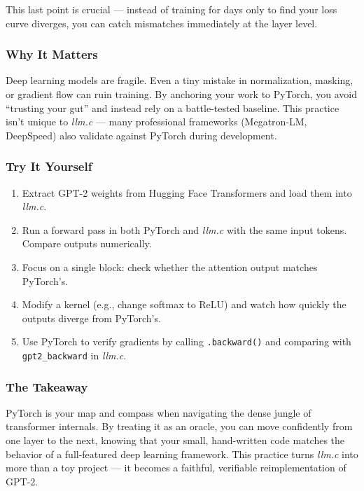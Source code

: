 \documentclass[
  letterpaper,
  DIV=11,
  numbers=noendperiod]{scrreprt}
\providecommand{\tightlist}{%
  \setlength{\itemsep}{0pt}\setlength{\parskip}{0pt}}
\begin{document}
This last point is crucial --- instead of training for days only to find
your loss curve diverges, you can catch mismatches immediately at the
layer level.

\subsubsection{Why It Matters}\label{why-it-matters-61}

Deep learning models are fragile. Even a tiny mistake in normalization,
masking, or gradient flow can ruin training. By anchoring your work to
PyTorch, you avoid ``trusting your gut'' and instead rely on a
battle-tested baseline. This practice isn't unique to \emph{llm.c} ---
many professional frameworks (Megatron-LM, DeepSpeed) also validate
against PyTorch during development.

\subsubsection{Try It Yourself}\label{try-it-yourself-75}

\begin{enumerate}
\def\labelenumi{\arabic{enumi}.}
\tightlist
\item
  Extract GPT-2 weights from Hugging Face Transformers and load them
  into \emph{llm.c}.
\item
  Run a forward pass in both PyTorch and \emph{llm.c} with the same
  input tokens. Compare outputs numerically.
\item
  Focus on a single block: check whether the attention output matches
  PyTorch's.
\item
  Modify a kernel (e.g., change softmax to ReLU) and watch how quickly
  the outputs diverge from PyTorch's.
\item
  Use PyTorch to verify gradients by calling \texttt{.backward()} and
  comparing with \texttt{gpt2\_backward} in \emph{llm.c}.
\end{enumerate}

\subsubsection{The Takeaway}\label{the-takeaway-76}

PyTorch is your map and compass when navigating the dense jungle of
transformer internals. By treating it as an oracle, you can move
confidently from one layer to the next, knowing that your small,
hand-written code matches the behavior of a full-featured deep learning
framework. This practice turns \emph{llm.c} into more than a toy project
--- it becomes a faithful, verifiable reimplementation of GPT-2.
\end{document}

